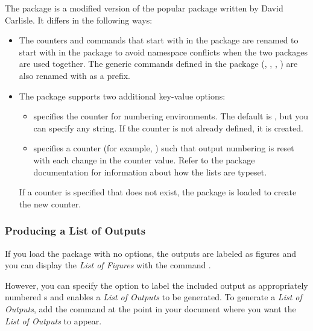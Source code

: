 \documentclass[article,oneside]{memoir}
\begin{document}
  The  package is a modified version of the popular  
  package %
  written by David Carlisle. 
  It differs in the following ways:
     \begin{itemize}
     \item The counters and commands that start with  in the 
     package are renamed 
     to start with  in the  package to avoid
     namespace conflicts when the two packages are used together.  
     The generic commands defined in the  package
   (, , , ) are
   also renamed with  as a prefix.
   
     \item The  package supports two additional key-value options:
       \begin{itemize}
         \item {} specifies the counter for numbering  environments. 
         The default is , but you can specify
              any string. If the counter is not already defined,
              it is created.
       
        \item {} specifies a counter (for example, ) such
     that output numbering is reset with each change in the counter value.
     Refer to the  package documentation for information about how the 
     lists are typeset.
       \end{itemize}
       
       If a counter is specified that does not exist,
       the  package is 
       loaded to create the new counter.
         
   \end{itemize}
    \subsubsection{Producing a List of Outputs}\label{listof}
     
  If you load the package with no options, 
  the outputs are labeled as figures and you can display the \textit{List of Figures} 
  with the command .

  However, you can specify  the  option to
  label the included output as 
  appropriately numbered s and enables a \textit{List of Outputs} to be generated.
  To generate a \textit{List of Outputs}, add the  
  command at the point in your document where you want
  the \textit{List of Outputs} to appear. 
  
\end{document}
